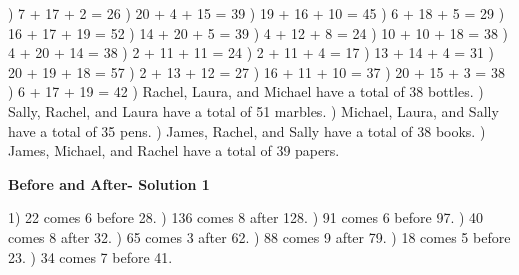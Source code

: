 \documentclass{article}%
\begin{document}
) 7 + 17 + 2 = 26%
) 20 + 4 + 15 = 39%
) 19 + 16 + 10 = 45%
) 6 + 18 + 5 = 29%
) 16 + 17 + 19 = 52%
) 14 + 20 + 5 = 39%
) 4 + 12 + 8 = 24%
) 10 + 10 + 18 = 38%
) 4 + 20 + 14 = 38%
) 2 + 11 + 11 = 24%
) 2 + 11 + 4 = 17%
) 13 + 14 + 4 = 31%
) 20 + 19 + 18 = 57%
) 2 + 13 + 12 = 27%
) 16 + 11 + 10 = 37%
) 20 + 15 + 3 = 38%
) 6 + 17 + 19 = 42%
) Rachel, Laura, and Michael have a total of 38 bottles.%
) Sally, Rachel, and Laura have a total of 51 marbles.%
) Michael, Laura, and Sally have a total of 35 pens.%
) James, Rachel, and Sally have a total of 38 books.%
) James, Michael, and Rachel have a total of 39 papers.%
\newline%
\newpage%
\large%
\begin{center}%
\textbf{Before and After- Solution 1}%
\newline%
\end{center} \normalsize%
1) 22 comes 6 before 28.%
) 136 comes 8 after 128.%
) 91 comes 6 before 97.%
) 40 comes 8 after 32.%
) 65 comes 3 after 62.%
) 88 comes 9 after 79.%
) 18 comes 5 before 23.%
) 34 comes 7 before 41.%
\newline%
\end{document}
